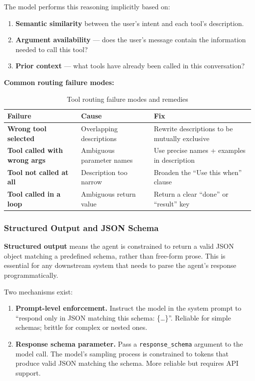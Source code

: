 \documentclass[12pt, a4paper]{article}
\newcommand{\kterm}[1]{\textbf{\textcolor{keyterm}{#1}}}
\begin{document}
\begin{theorybox}
The model performs this reasoning implicitly based on:

\begin{enumerate}[leftmargin=*, itemsep=2pt]
  \item \textbf{Semantic similarity} between the user's intent and each tool's description.
  \item \textbf{Argument availability} --- does the user's message contain the information needed to call this tool?
  \item \textbf{Prior context} --- what tools have already been called in this conversation?
\end{enumerate}

\noindent\textbf{Common routing failure modes:}

\begin{table}[h!]
\centering
\small
\begin{tabular}{>{\bfseries}p{3.5cm} p{4.5cm} p{4cm}}
\toprule
\textbf{Failure} & \textbf{Cause} & \textbf{Fix} \\
\midrule
Wrong tool selected & Overlapping descriptions & Rewrite descriptions to be mutually exclusive \\
\addlinespace
Tool called with wrong args & Ambiguous parameter names & Use precise names + examples in description \\
\addlinespace
Tool not called at all & Description too narrow & Broaden the ``Use this when'' clause \\
\addlinespace
Tool called in a loop & Ambiguous return value & Return a clear ``done'' or ``result'' key \\
\bottomrule
\end{tabular}
\caption{Tool routing failure modes and remedies}
\end{table}

\subsubsection*{Structured Output and JSON Schema}

\kterm{Structured output} means the agent is constrained to return a valid JSON object matching a predefined schema, rather than free-form prose. This is essential for any downstream system that needs to parse the agent's response programmatically.

\medskip

Two mechanisms exist:

\begin{enumerate}[leftmargin=*, itemsep=3pt]
  \item \textbf{Prompt-level enforcement.} Instruct the model in the system prompt to ``respond only in JSON matching this schema: \{\ldots\}''. Reliable for simple schemas; brittle for complex or nested ones.
  \item \textbf{Response schema parameter.} Pass a \texttt{response\_schema} argument to the model call. The model's sampling process is constrained to tokens that produce valid JSON matching the schema. More reliable but requires API support.
\end{enumerate}


\end{theorybox}
\end{document}
